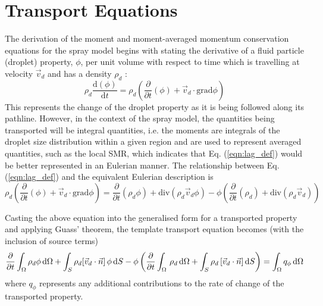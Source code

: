 \documentclass[a4paper,10pt]{article}
\begin{document}
\section{Transport Equations} \label{sec:trans_eqn}
The derivation of the moment and moment-averaged momentum conservation equations for the spray model begins with stating the derivative of a fluid particle (droplet) property, $\phi$, per unit volume with respect to time which is travelling at velocity $\vec{v}_d$ and has a density $\rho_d$ \cite{versteeg2006}:
\begin{equation} \label{eqn:lag_def}
\rho_d \frac{\mathrm{d}(\phi)}{\mathrm{d} t}
= \rho_d \left( \frac{\partial}{\partial t}(\phi) + \vec{v}_d \cdot \mathrm{grad} \phi \right)
\end{equation}
This represents the change of the droplet property as it is being followed along its pathline. However, in the context of the spray model, the quantities being transported will be integral quantities, i.e. the moments are integrals of the droplet size distribution within a given region and are used to represent averaged quantities, such as the local SMR, which indicates that Eq. (\ref{eqn:lag_def}) would be better represented in an Eulerian manner. The relationship between Eq. (\ref{eqn:lag_def}) and the equivalent Eulerian description is
\begin{equation} \label{eqn:eul_def}
\rho_d \left( \frac{\partial}{\partial t}(\phi) + \vec{v}_d \cdot \mathrm{grad} \phi \right)
= \frac{\partial}{\partial t} (\rho_d \phi) + \mathrm{div} (\rho_d \vec{v}_d \phi)
- \phi \left( \frac{\partial}{\partial t}(\rho_d) + \mathrm{div} (\rho_d \vec{v}_d) \right)
\end{equation}

Casting the above equation into the generalised form for a transported property and applying Guass' theorem, the template transport equation becomes (with the inclusion of source terms)
\begin{equation} \label{eqn:eul_cast}
\frac{\partial}{\partial t} \int_{\Omega} \rho_d \phi\, \mathrm{d}\Omega \\
+ \int_{S} \rho_d [\vec{v}_d \cdot \vec{n}]\, \phi\, \mathrm{d}S \\
- \phi \left( \frac{\partial}{\partial t} \int_{\Omega} \,\rho_d\, \mathrm{d} \Omega
+ \int_{S} \rho_d\,[\vec{v}_{d} \cdot \vec{n}]\, \mathrm{d} S \right)
= \int_{\Omega} q_{\phi}\, \mathrm{d}\Omega
\end{equation}
where $q_{\phi}$ represents any additional contributions to the rate of change of the transported property.
\end{document}
